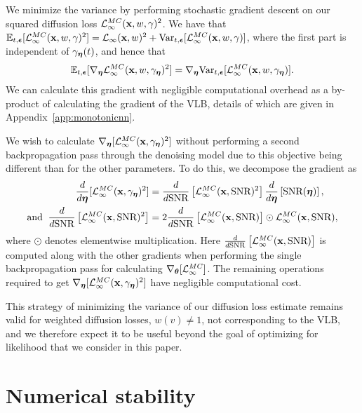 \documentclass{article}
\newcommand{\snr}{\text{SNR}}
\begin{document}
We minimize the variance by performing stochastic gradient descent on our squared diffusion loss $\mathcal{L}^{MC}_{\infty}({\mathbf{x}},w,\gamma)^{2}$. We have that $\mathbb{E}_{t,{\boldsymbol{\epsilon}}}[\mathcal{L}^{MC}_{\infty}({\mathbf{x}},w,\gamma)^{2}] = \mathcal{L}_{\infty}({\mathbf{x}},w)^{2} + \mathrm{Var}_{t,{\boldsymbol{\epsilon}}}[\mathcal{L}^{MC}_{\infty}({\mathbf{x}},w,\gamma)]$, where the first part is independent of $\gamma_{{\boldsymbol{\eta}}}(t)$, and hence that
\begin{align}
\mathbb{E}_{t,{\boldsymbol{\epsilon}}}[\nabla_{{\boldsymbol{\eta}}} \mathcal{L}^{MC}_{\infty}({\mathbf{x}},w,\gamma_{{\boldsymbol{\eta}}})^{2}] =    \nabla_{{\boldsymbol{\eta}}} \mathrm{Var}_{t,{\boldsymbol{\epsilon}}}[\mathcal{L}^{MC}_{\infty}({\mathbf{x}},w,\gamma_{{\boldsymbol{\eta}}})].
\end{align}
We can calculate this gradient with negligible computational overhead as a by-product of calculating the gradient of the VLB, details of which are given in Appendix~\ref{app:monotonicnn}.

We wish to calculate $\nabla_{{\boldsymbol{\eta}}}[ \mathcal{L}^{MC}_{\infty}({\mathbf{x}},\gamma_{{\boldsymbol{\eta}}})^{2}]$ without performing a second backpropagation pass through the denoising model due to this objective being different than for the other parameters. To do this, we decompose the gradient as
\begin{align}
\frac{d}{d \boldeta}[ \mathcal{L}^{MC}_{\infty}(\rvx,\gamma_{\boldeta})^{2}] &= \frac{d}{d \snr}\left[ \mathcal{L}^{MC}_{\infty}(\rvx,\snr)^{2}\right]\frac{d}{d \boldeta}\left[\snr(\boldeta)\right],\\
\text{and\;\;} \frac{d}{d \snr}\left[ \mathcal{L}^{MC}_{\infty}(\rvx,\snr)^{2}\right] &= 2\frac{d}{d \snr}\left[ \mathcal{L}^{MC}_{\infty}(\rvx,\snr)\right] \odot \mathcal{L}^{MC}_{\infty}(\rvx,\snr),
\end{align}
where $\odot$ denotes elementwise multiplication.
Here $\frac{d}{d \snr}\left[ \mathcal{L}^{MC}_{\infty}(\rvx,\snr)\right]$ is computed along with the other gradients when performing the single backpropagation pass for calculating $\nabla_{{\boldsymbol{\theta}}}[ \mathcal{L}^{MC}_{\infty}]$. The remaining operations required to get $\nabla_{{\boldsymbol{\eta}}} [\mathcal{L}^{MC}_{\infty}({\mathbf{x}},\gamma_{{\boldsymbol{\eta}}})^{2}]$ have negligible computational cost.

This strategy of minimizing the variance of our diffusion loss estimate remains valid for weighted diffusion losses, $w(v) \neq 1$, not corresponding to the VLB, and we therefore expect it to be useful beyond the goal of optimizing for likelihood that we consider in this paper.

\section{Numerical stability}
\label{sec:stable}
\end{document}
